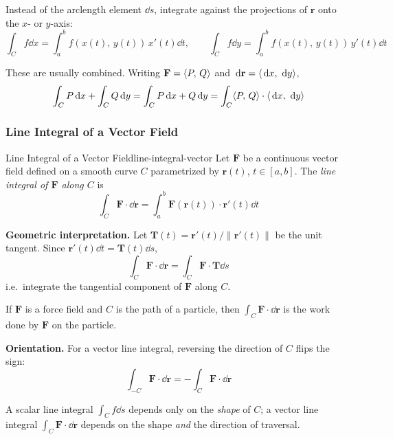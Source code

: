 Instead of the arclength element $\dd{s}$, integrate against the projections of $\mathbf{r}$
onto the $x$- or $y$-axis:
\[
  \int_C f\dd{x} = \int_a^b f(x(t),\,y(t))\,x'(t)\dd{t},
  \qquad
  \int_C f\dd{y} = \int_a^b f(x(t),\,y(t))\,y'(t)\dd{t}
\]

These are usually combined. Writing $\mathbf{F} = \langle P,\,Q \rangle$ and $\,\mathrm{d}\mathbf{r} = \langle \,\mathrm{d}x,\,\,\mathrm{d}y \rangle$,
\[
  \int_C P\,\mathrm{d}x + \int_C Q\,\mathrm{d}y
  = \int_C P\,\mathrm{d}x + Q\,\mathrm{d}y
  = \int_C \langle P,\,Q \rangle\cdot\langle \,\mathrm{d}x,\,\,\mathrm{d}y \rangle
\]

\subsubsection{Line Integral of a Vector Field}

\begin{definition}{Line Integral of a Vector Field}{line-integral-vector}
  Let $\mathbf{F}$ be a continuous vector field defined on a smooth curve $C$
  parametrized by $\mathbf{r}(t)$, $t\in[a,b]$. The \emph{line integral of $\mathbf{F}$
    along $C$} is
  \[
    \int_C \mathbf{F}\cdot \dd{\mathbf{r}}
    = \int_a^b \mathbf{F}(\mathbf{r}(t))\cdot\mathbf{r}'(t)\dd{t}
  \]
\end{definition}

\textbf{Geometric interpretation.} Let $\mathbf{T}(t) = \mathbf{r}'(t)/\lVert\mathbf{r}'(t)\rVert$
be the unit tangent. Since $\mathbf{r}'(t)\dd{t} = \mathbf{T}(t)\dd{s}$,
\[
  \int_C \mathbf{F}\cdot \dd{\mathbf{r}}
  = \int_C \mathbf{F}\cdot\mathbf{T}\dd{s}
\]
i.e.\ integrate the tangential component of $\mathbf{F}$ along $C$.

\begin{example}
  If $\mathbf{F}$ is a force field and $C$ is the path of a particle, then
  $\int_C \mathbf{F}\cdot \dd{\mathbf{r}}$ is the work done by $\mathbf{F}$ on the particle.
\end{example}

\textbf{Orientation.} For a vector line integral, reversing the direction of $C$
flips the sign:
\[
  \int_{-C} \mathbf{F}\cdot \dd{\mathbf{r}} = -\int_C \mathbf{F}\cdot \dd{\mathbf{r}}
\]

\begin{remark}
  A scalar line integral $\int_C f\dd{s}$ depends only on the \emph{shape} of $C$;
  a vector line integral $\int_C \mathbf{F}\cdot \dd{\mathbf{r}}$ depends on the shape
  \emph{and} the direction of traversal.
\end{remark}

